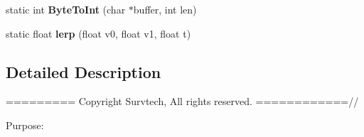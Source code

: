 \begin{DoxyCompactItemize}
\item 
static int {\bfseries Byte\+To\+Int} (char $\ast$buffer, int len)\hypertarget{namespace_helpers_a258e005b3dfd09b5b22f93b80320699c}{}\label{namespace_helpers_a258e005b3dfd09b5b22f93b80320699c}

\item 
static float {\bfseries lerp} (float v0, float v1, float t)\hypertarget{namespace_helpers_a44b075f732010fe62effbfaeeef8ac80}{}\label{namespace_helpers_a44b075f732010fe62effbfaeeef8ac80}

\end{DoxyCompactItemize}


\subsection{Detailed Description}
========= Copyright Survtech, All rights reserved. ============//

Purpose\+: 

 